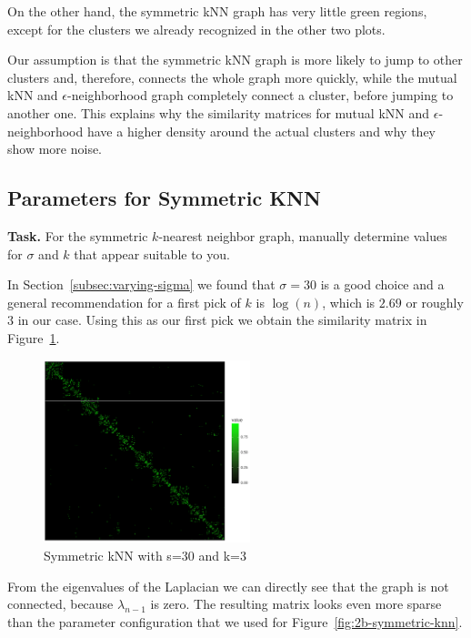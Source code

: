 \documentclass{support/acm_proc_article-sp}
\begin{document}
    On the other hand, the symmetric kNN graph has very little green regions, except for the clusters we
    already recognized in the other two plots.

    Our assumption is that the symmetric kNN graph is more likely to jump to other clusters and, therefore,
    connects the whole graph more quickly, while the mutual kNN and $\epsilon$-neighborhood graph completely connect
    a cluster, before jumping to another one.
    This explains why the similarity matrices for mutual kNN and $\epsilon$-neighborhood have a higher density
    around the actual clusters and why they show more noise.


    \subsection{Parameters for Symmetric KNN}
    \label{subsec:parameters}

    \textbf{Task.} For the symmetric $k$-nearest neighbor graph, manually determine values for $\sigma$ and $k$ that
    appear suitable to you.

    In Section~\ref{subsec:varying-sigma} we found that $\sigma = 30$ is a good choice and a general recommendation for
    a first pick of $k$ is $\log(n)$, which is $2.69$ or roughly $3$ in our case.
    Using this as our first pick we obtain the similarity matrix in Figure~\ref{fig:2c-s30-k3}.
    \begin{figure}[htbp]
        \centering
        \includegraphics[width=6cm]{images/2c-s30-k3.png}
        \caption{Symmetric kNN with s=30 and k=3}
        \label{fig:2c-s30-k3}
    \end{figure}
    From the eigenvalues of the Laplacian we can directly see that the graph is not connected,
    because $\lambda_{n-1}$ is zero.
    The resulting matrix looks even more sparse than the parameter configuration that we used
    for Figure~\ref{fig:2b-symmetric-knn}.
\end{document}
